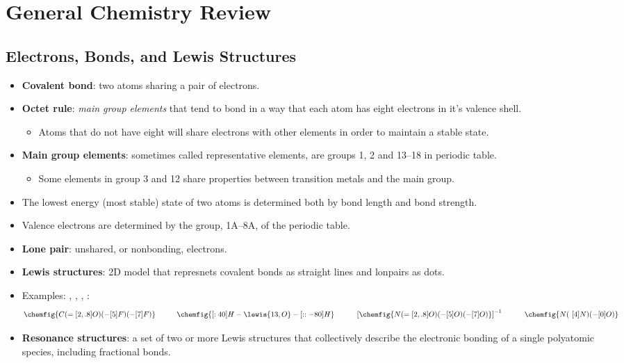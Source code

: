 \documentclass[12pt,a4paper]{article}
\begin{document}
\tableofcontents
\cleardoublepage
\fancyhead{}

\clearpage
\clearpage
\section{General Chemistry Review}
\subsection{Electrons, Bonds, and Lewis Structures}
\begin{itemize}
    \item \textbf{Covalent bond}: two atoms sharing a pair of electrons.
    \item \textbf{Octet rule}: \textit{main group elements} that tend to bond in a way that each atom has {\color{o-Sun}eight} electrons in it's valence shell.
        \begin{itemize}
            \item Atoms that do not have eight will share electrons with other elements in order to maintain a stable state.
        \end{itemize}
    \item \textbf{Main group elements}: sometimes called representative elements, are groups 1, 2 and 13--18 in periodic table.
        \begin{itemize}
            \item Some elements in group 3 and 12 share properties between transition metals and the main group.
        \end{itemize}
    \item The lowest energy (most stable) state of two atoms is determined both by bond length and bond strength.
    \item Valence electrons are determined by the group, 1A--8A, of the periodic table.
    \item \textbf{Lone pair}: unshared, or nonbonding, electrons.
    \item \textbf{Lewis structures}: 2D model that represnets covalent bonds as straight lines and lonpairs as dots.
    \item Examples: , , , :
        \begin{align*}
            \chemfig{C(=[2,.8]O)(-[5]F)(-[7]F)}
            \hspace{1cm}
            \chemfig{[:40]H-\lewis{13,O}-[::-80]H} 
            \hspace{1cm}
            \left[\chemfig{N(=[2,.8]O)(-[5]O)(-[7]O)}\right]^{-1} 
            \hspace{1cm}
            \chemfig{N(~[4]N)(-[0]O)}
        \end{align*}
    \item \textbf{Resonance structures}: a set of two or more Lewis structures that collectively describe the electronic bonding of a single polyatomic species, including fractional bonds.

\end{itemize}
\end{document}
